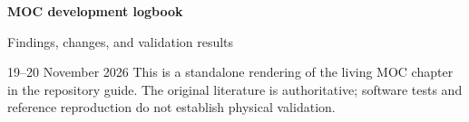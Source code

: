 \documentclass[11pt,letterpaper,openany]{report}
\begin{document}
\begin{titlepage}
\vspace*{1cm}
{\Huge\sffamily\bfseries\color{ink}MOC development logbook\par}
\vspace{0.7cm}
{\Large\color{teal}Findings, changes, and validation results\par}
\vspace{1cm}
19--20 November 2026
\vfill
This is a standalone rendering of the living MOC chapter in the repository guide.
The original literature is authoritative; software tests and reference reproduction do not establish physical validation.
\end{titlepage}
\tableofcontents
\clearpage

\end{document}
